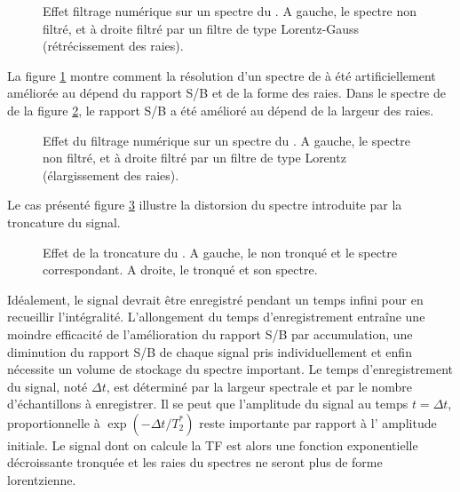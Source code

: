 \begin{figure}[hbt]
\begin{center}
\end{center}
\caption[Effet du filtrage numérique sur un spectre du \prot.]
{Effet filtrage numérique sur un spectre du \prot.
A gauche, le spectre non filtré, et à droite filtré par un filtre de type
Lorentz-Gauss (rétrécissement des raies).}
\label{fig:apodH}
\end{figure}

La figure \ref{fig:apodH} montre comment 
la résolution d'un spectre de \prot à été artificiellement améliorée au dépend 
du rapport S/B et de la forme des raies.
Dans le spectre de \carb de la figure \ref{fig:apodC}, le rapport S/B
a été amélioré au dépend de la largeur des raies.

\begin{figure}[hbt]
\begin{center}
\end{center}
\caption[Effet filtrage numérique sur un spectre du \carb.]
{Effet du filtrage numérique sur un spectre du \carb.
A gauche, le spectre non filtré, et à droite filtré par un filtre de type
Lorentz (élargissement des raies).}
\label{fig:apodC}
\end{figure}

Le cas présenté figure \ref{fig:trunc} illustre la distorsion du spectre 
introduite par la troncature du signal.

\begin{figure}[hbt]
\begin{center}
\end{center}
\caption[Effet de la troncature du \FID.]
{Effet de la troncature du \FID.
A gauche, le {\FID} non tronqué et le spectre correspondant.
A droite, le {\FID} tronqué et son spectre.}
\label{fig:trunc}
\end{figure}

Idéalement, le signal devrait être enregistré pendant un temps infini pour en 
recueillir l'intégralité. 
L'allongement du temps d'enregistrement entraîne une moindre 
efficacité de l'amélioration du rapport S/B par accumulation, une diminution du rapport 
S/B de chaque signal pris individuellement et enfin nécessite un volume de stockage du 
spectre important. 
Le temps d'enregistrement du signal, noté $\Delta t$, est déterminé par la 
largeur spectrale et par le nombre d'échantillons à enregistrer. Il se peut que l'amplitude 
du signal au temps $t = \Delta t$, proportionnelle à $\exp(-\Delta t/T_2^*)$
reste importante par rapport 
à l' amplitude initiale.
Le signal dont on calcule la TF est alors une fonction 
exponentielle décroissante tronquée et les raies du spectres ne seront plus de forme 
lorentzienne.

